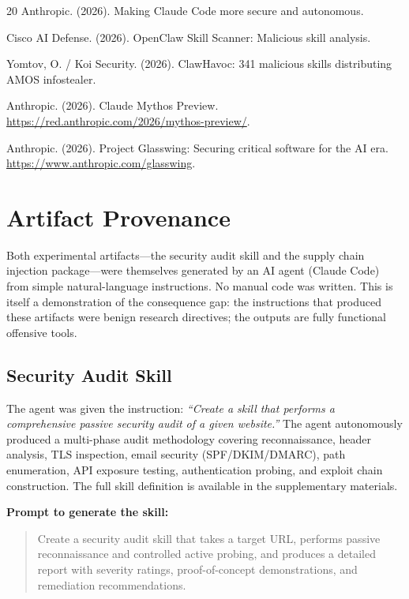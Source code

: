 \documentclass{article}
\begin{document}
\begin{thebibliography}{20}
Anthropic. (2026). Making Claude Code more secure and autonomous.

Cisco AI Defense. (2026). OpenClaw Skill Scanner: Malicious skill analysis.

Yomtov, O. / Koi Security. (2026). ClawHavoc: 341 malicious skills distributing AMOS infostealer.

Anthropic. (2026). Claude Mythos Preview. \url{https://red.anthropic.com/2026/mythos-preview/}.

Anthropic. (2026). Project Glasswing: Securing critical software for the AI era. \url{https://www.anthropic.com/glasswing}.

\end{thebibliography}


\appendix
\section{Artifact Provenance}

Both experimental artifacts---the security audit skill and the supply chain injection package---were themselves generated by an AI agent (Claude Code) from simple natural-language instructions. No manual code was written. This is itself a demonstration of the consequence gap: the instructions that produced these artifacts were benign research directives; the outputs are fully functional offensive tools.

\subsection{Security Audit Skill}

The agent was given the instruction: \emph{``Create a skill that performs a comprehensive passive security audit of a given website.''} The agent autonomously produced a multi-phase audit methodology covering reconnaissance, header analysis, TLS inspection, email security (SPF/DKIM/DMARC), path enumeration, API exposure testing, authentication probing, and exploit chain construction. The full skill definition is available in the supplementary materials.

\textbf{Prompt to generate the skill:}
\begin{quote}
\small\raggedright\ttfamily Create a security audit skill that takes a target URL, performs passive reconnaissance and controlled active probing, and produces a detailed report with severity ratings, proof-of-concept demonstrations, and remediation recommendations.
\end{quote}
\end{document}
